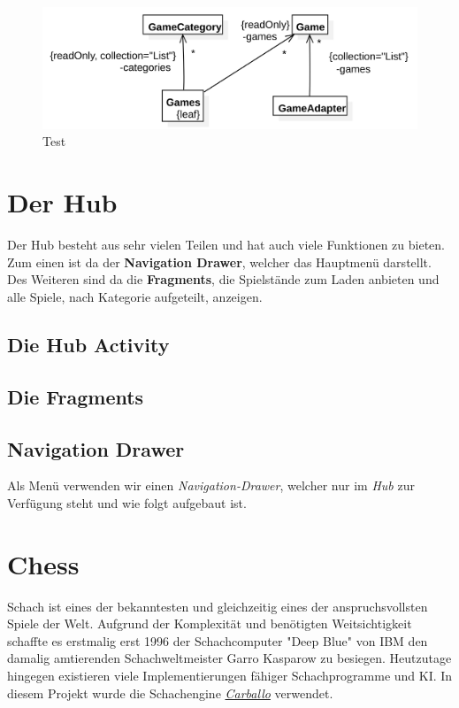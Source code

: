 \begin{figure}[h]
	\centering
	\includegraphics{resources/gamemanager/gamemanager_uml}
	\caption{Test}
	\label{fig:gm_uml}
\end{figure}

\section{Der Hub}
\sectionauthor{\leonard}

Der Hub besteht aus sehr vielen Teilen und hat auch viele Funktionen zu bieten.
Zum einen ist da der \textbf{Navigation Drawer}, welcher das Hauptmenü
darstellt. Des Weiteren sind da die \textbf{Fragments}, die Spielstände zum
Laden anbieten und alle Spiele, nach Kategorie aufgeteilt, anzeigen.

\subsection{Die Hub Activity}

\subsection{Die Fragments}

\subsection{Navigation Drawer}

Als Menü verwenden wir einen \emph{Navigation-Drawer}, welcher nur im \emph{Hub}
zur Verfügung steht und wie folgt aufgebaut ist.


\section{Chess}
\sectionauthor{\oliver}

Schach ist eines der bekanntesten und gleichzeitig eines der anspruchsvollsten
Spiele der Welt. Aufgrund der Komplexität und benötigten Weitsichtigkeit
schaffte es erstmalig erst 1996 der Schachcomputer "Deep Blue" von IBM den
damalig amtierenden Schachweltmeister Garro Kasparow zu besiegen.
 Heutzutage hingegen existieren viele Implementierungen
fähiger Schachprogramme und KI. In diesem Projekt wurde die Schachengine
\hyperlink{https://github.com/albertoruibal/carballo}{\emph{Carballo}}
verwendet.  

